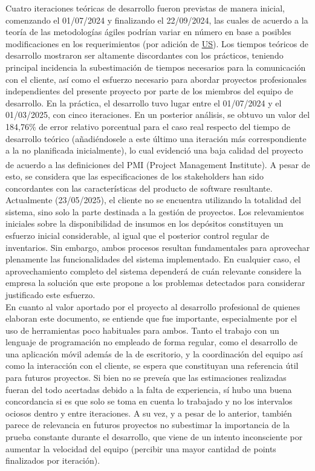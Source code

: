 \documentclass[a4paper, 12pt,twoside]{report}  %
\numberwithin{equation}{subsection} %
\begin{document}
\indent Cuatro iteraciones teóricas de desarrollo fueron previstas de manera inicial, comenzando el 01/07/2024 y finalizando el 22/09/2024, las cuales de acuerdo a la teoría de las metodologías ágiles podrían variar en número en base a posibles modificaciones en los requerimientos (por adición de \hyperlink{US}{US}). Los tiempos teóricos de desarrollo mostraron ser altamente discordantes con los prácticos, teniendo principal incidencia la subestimación de tiempos necesarios para la comunicación con el cliente, así como el esfuerzo necesario para abordar proyectos profesionales independientes del presente proyecto por parte de los miembros del equipo de desarrollo. En la práctica, el desarrollo tuvo lugar entre el 01/07/2024 y el 01/03/2025, con cinco iteraciones. En un posterior análisis, se obtuvo un valor del 184,76\% de error relativo porcentual para el caso real respecto del tiempo de desarrollo teórico (añadiéndosele a este último una iteración más correspondiente a la no planificada inicialmente), lo cual evidenció una baja calidad del proyecto de acuerdo a las definiciones del PMI\textsuperscript{\tiny\textregistered} (Project Management Institute). A pesar de esto, se considera que las especificaciones de los stakeholders han sido concordantes con las características del producto de software resultante.\\
\indent Actualmente (23/05/2025), el cliente no se encuentra utilizando la totalidad del sistema, sino solo la parte destinada a la gestión de proyectos. Los relevamientos iniciales sobre la disponibilidad de insumos en los depósitos constituyen un esfuerzo inicial considerable, al igual que el posterior control regular de inventarios. Sin embargo, ambos procesos resultan fundamentales para aprovechar plenamente las funcionalidades del sistema implementado. En cualquier caso, el aprovechamiento completo del sistema dependerá de cuán relevante considere la empresa la solución que este propone a los problemas detectados para considerar justificado este esfuerzo.\\
\indent En cuanto al valor aportado por el proyecto al desarrollo profesional de quienes elaboran este documento, se entiende que fue importante, especialmente por el uso de herramientas poco habituales para ambos. Tanto el trabajo con un lenguaje de programación no empleado de forma regular, como el desarrollo de una aplicación móvil además de la de escritorio, y la coordinación del equipo así como la interacción con el cliente, se espera que constituyan una referencia útil para futuros proyectos. Si bien no se preveía que las estimaciones realizadas fueran del todo acertadas debido a la falta de experiencia, sí hubo una buena concordancia si es que solo se toma en cuenta lo trabajado y no los intervalos ociosos dentro y entre iteraciones. A su vez, y a pesar de lo anterior, también parece de relevancia en futuros proyectos no subestimar la importancia de la prueba constante durante el desarrollo, que viene de un intento inconsciente por aumentar la velocidad del equipo (percibir una mayor cantidad de points finalizados por iteración).
\end{document}
